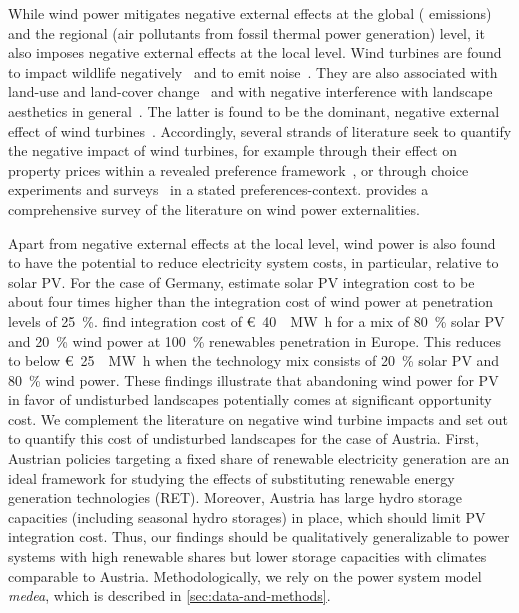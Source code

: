 \documentclass[review, 3p, times, 12pt, authoryear]{elsarticle}
\begin{document}
    While wind power mitigates negative external effects at the global ( emissions) and the regional (air pollutants from fossil thermal power generation) level, it also imposes negative external effects at the local level.
    Wind turbines are found to impact wildlife negatively~\citep{Loss2013,Voigt2015,Wang2015} and to emit noise~\citep{Wang2015a}.
    They are also associated with land-use and land-cover change~\citep{Turkovska2020} and with negative interference with landscape aesthetics in general~\citep{Jones2010, Meyerhoff2010}.
    The latter is found to be the dominant, negative external effect of wind turbines~\citep{Mattmann2016}.
    Accordingly, several strands of literature seek to quantify the negative impact of wind turbines, for example through their effect on property prices within a revealed preference framework~\citep{Droees2016, Gibbons2015,
    Heintzelmann2017, Jensen2018, Kussel2019, Lang2014, Sims2008, Sunak2016, Vyn2014}, or through choice experiments and surveys~\citep{Drechsler2011, Mattmann2016, Meyerhoff2010} in a stated preferences-context.
    \cite{Zerrahn2017} provides a comprehensive survey of the literature on wind power externalities.

    Apart from negative external effects at the local level, wind power is also found to have the potential to reduce electricity system costs, in particular, relative to solar PV.
    For the case of Germany, \cite{Ueckerdt2013} estimate solar PV integration cost to be about four times higher than the integration cost of wind power at penetration levels of \SI{25}{\percent}.
    \cite{Scholz2017} find integration cost of \SI[per-mode=symbol,sticky-per, bracket-unit-denominator=false]{40}[\euro]{\per\mega\watt\hour} for a mix of \SI{80}{\percent} solar PV and \SI{20}{\percent} wind power at \SI{100}{\percent} renewables penetration in Europe.
    This reduces to below \SI[per-mode=symbol,sticky-per, bracket-unit-denominator=false]{25}[\euro]{\per\mega\watt\hour} when the technology mix consists of \SI{20}{\percent} solar PV and \SI{80}{\percent} wind power.
    These findings illustrate that abandoning wind power for PV in favor of undisturbed landscapes potentially comes at significant opportunity cost.
    We complement the literature on negative wind turbine impacts and set out to quantify this cost of undisturbed landscapes for the case of Austria.
    First, Austrian policies targeting a fixed share of renewable electricity generation are an ideal framework for studying the effects of substituting renewable energy generation technologies (RET).
    Moreover, Austria has large hydro storage capacities (including seasonal hydro storages) in place, which should limit PV integration cost.
    Thus, our findings should be qualitatively generalizable to power systems with high renewable shares but lower storage capacities with climates comparable to Austria.
    Methodologically, we rely on the power system model \emph{medea}, which is described in \autoref{sec:data-and-methods}.
\end{document}
